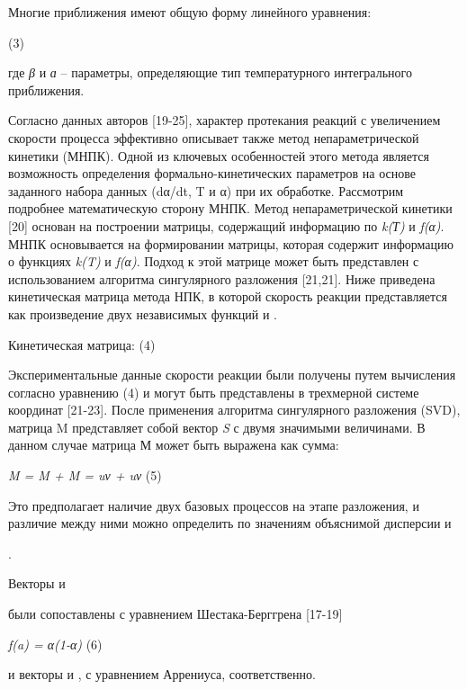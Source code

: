 Многие приближения имеют общую форму линейного уравнения:

(3)

где \emph{β} и \emph{ɑ} -- параметры, определяющие тип температурного
интегрального приближения.

Согласно данных авторов {[}19-25{]}, характер протекания реакций с
увеличением скорости процесса эффективно описывает также метод
непараметрической кинетики (МНПК). Одной из ключевых особенностей этого
метода является возможность определения формально-кинетических
параметров на основе заданного набора данных (dα/dt, T и α) при их
обработке. Рассмотрим подробнее математическую сторону МНПК. Метод
непараметрической кинетики {[}20{]} основан на построении матрицы,
содержащий информацию по \emph{k(Т)} и \emph{f(α)}. МНПК основывается на
формировании матрицы, которая содержит информацию о функциях \emph{k(T)}
и \emph{f(α)}. Подход к этой матрице может быть представлен с
использованием алгоритма сингулярного разложения {[}21,21{]}. Ниже
приведена кинетическая матрица метода НПК, в которой скорость реакции
представляется как произведение двух независимых функций
и
.

Кинетическая матрица:
(4)

Экспериментальные данные скорости реакции были получены путем вычисления
согласно уравнению (4) и могут быть представлены в трехмерной системе
координат {[}21-23{]}. После применения алгоритма сингулярного
разложения (SVD), матрица M представляет собой вектор \emph{S} с двумя
значимыми величинами. В данном случае матрица М может быть выражена как
сумма:

\emph{M = M + M =
uν +
uν} (5)

Это предполагает наличие двух базовых процессов на этапе разложения, и
различие между ними можно определить по значениям объяснимой дисперсии
и

.

Векторы
и

были сопоставлены с уравнением Шестака-Берггрена {[}17-19{]}

\emph{f(a) = α(1-α)} (6)

и векторы
и
, с
уравнением Аррениуса, соответственно.

